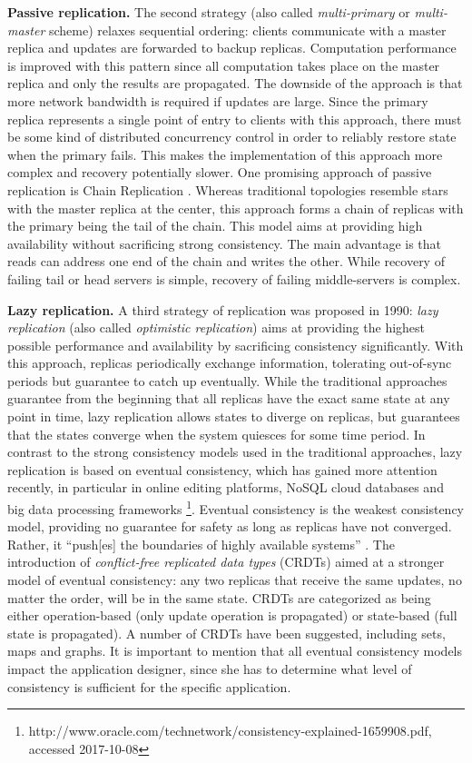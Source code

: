 \textbf{Passive replication.} The second strategy (also called \textit{multi-primary} or \textit{multi-master} scheme) relaxes sequential ordering: clients communicate with a master replica and updates are forwarded to backup replicas.
Computation performance is improved with this pattern since all computation takes place on the master replica and only the results are propagated.
The downside of the approach is that more network bandwidth is required if updates are large.
Since the primary replica represents a single point of entry to clients with this approach, there must be some kind of distributed concurrency control in order to reliably restore state when the primary fails.
This makes the implementation of this approach more complex and recovery potentially slower.
One promising approach of passive replication is Chain Replication \cite{VanRenesse:2004}.
Whereas traditional topologies resemble stars with the master replica at the center, this approach forms a chain of replicas with the primary being the tail of the chain.
This model aims at providing high availability without sacrificing strong consistency.
The main advantage is that reads can address one end of the chain and writes the other.
While recovery of failing tail or head servers is simple, recovery of failing middle-servers is complex.

\textbf{Lazy replication.} A third strategy of replication was proposed in 1990: \textit{lazy replication} \cite{Ladin:1990,Ladin:1992} (also called \textit{optimistic replication}) aims at providing the highest possible performance and availability by sacrificing consistency significantly.
With this approach, replicas periodically exchange information, tolerating out-of-sync periods but guarantee to catch up eventually.
While the traditional approaches guarantee from the beginning that all replicas have the exact same state at any point in time, lazy replication allows states to diverge on replicas, but guarantees that the states converge when the system quiesces for some time period.
In contrast to the strong consistency models used in the traditional approaches, lazy replication is based on eventual consistency, which has gained more attention recently, in particular in online editing platforms, NoSQL cloud databases and big data processing frameworks \footnote{http://www.oracle.com/technetwork/consistency-explained-1659908.pdf, accessed 2017-10-08}.
Eventual consistency is the weakest consistency model, providing no guarantee for safety as long as replicas have not converged.
Rather, it ``push[es] the boundaries of highly available systems'' \cite{Bailis:2013}.
The introduction of \textit{conflict-free replicated data types} (CRDTs) \cite{Shapiro:2011} aimed at a stronger model of eventual consistency: any two replicas that receive the same updates, no matter the order, will be in the same state.
CRDTs are categorized as being either operation-based (only update operation is propagated) or state-based (full state is propagated).
A number of CRDTs have been suggested, including sets, maps and graphs.
It is important to mention that all eventual consistency models impact the application designer, since she has to determine what level of consistency is sufficient for the specific application.
